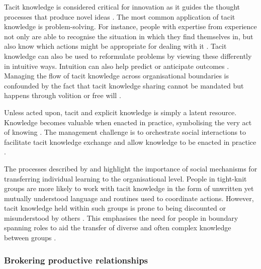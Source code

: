 Tacit knowledge is considered critical for innovation as it guides the thought processes that produce novel ideas \citep{leonard1998role,amar2008descriptive}. The most common application of tacit knowledge is problem-solving. For instance, people with expertise from experience not only are able to recognise the situation in which they find themselves in, but also know which actions might be appropriate for dealing with it \citep{simon1971human,leonard1998role}. Tacit knowledge can also be used to reformulate problems by viewing these differently in intuitive ways. Intuition can also help predict or anticipate outcomes \citep{leonard1998role}. Managing the flow of tacit knowledge across organisational boundaries is confounded by the fact that tacit knowledge sharing cannot be mandated but happens through volition or free will \citep{polanyi1966tacit}. 

Unless acted upon, tacit and explicit knowledge is simply a latent resource. Knowledge becomes valuable when enacted in practice, symbolising the very act of knowing \citep{cook1999bridging,duguid2005art,marabelli2014knowing,freeman2015knowledge}. The management challenge is to orchestrate social interactions to facilitate tacit knowledge exchange and allow knowledge to be enacted in practice \citep{haldin2000difficulties,lankilaa2005knowledge}.

The processes described by \citet{nonaka1995knowledge} and \citet{crossan1999organizational} highlight the importance of social mechanisms for transferring individual learning to the organisational level. People in tight-knit groups are more likely to work with tacit knowledge in the form of unwritten yet mutually understood language and routines used to coordinate actions. However, tacit knowledge held within such groups is prone to being discounted or misunderstood by others \citep{burt2007secondhand}. This emphasises the need for people in boundary spanning roles to aid the transfer of diverse and often complex knowledge between groups \citep{tushman1981boundary,allen1984managing,szulanski2003sticky,seidler2008use,meyer2010rise,chesbrough2012open}.

\subsubsection{Brokering productive relationships}

